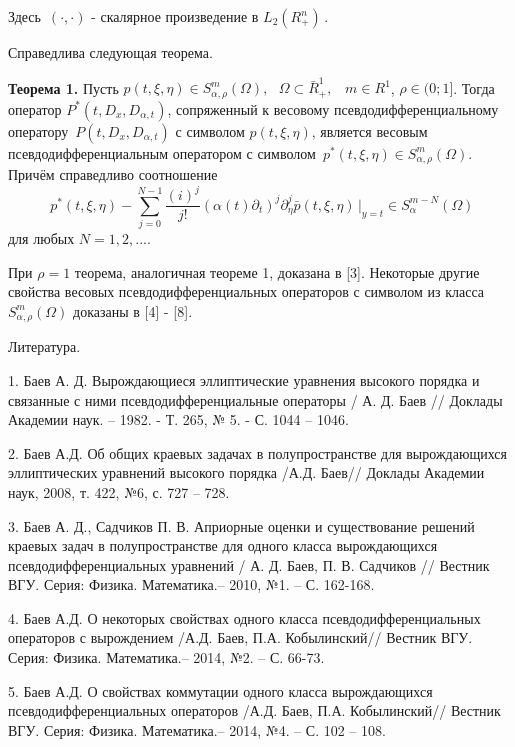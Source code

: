 {Здесь $\,( \cdot , \cdot )$ - скалярное произведение в $L_2 (R_ + ^n )\,$.

Справедлива следующая теорема.

\textbf{Теорема 1.} Пусть $p(t,\xi ,\eta ) \in S_{\alpha ,\rho }^m (\Omega
),\,\,\,\,\Omega \subset \bar {R}_ + ^1 ,\,\,\,\,\,m \in R^1$, $\rho \in
(0;1]$. Тогда оператор $P^\ast (t,D_x ,D_{\alpha ,t} )$, сопряженный к
весовому псевдодифференциальному оператору $\,P(t,D_x ,D_{\alpha ,t} )$ с
символом $p(t,\xi ,\eta )$, является весовым псевдодифференциальным
оператором с символом $\,p^\ast (t,\xi ,\eta ) \in S_{\alpha ,\rho }^m
(\Omega )$. Причём справедливо соотношение
\[
\,\,p^\ast (t,\xi ,\eta ) - \sum\limits_{j = 0}^{N - 1} {\frac{(i)^j}{j!}}
(\alpha (t)\partial _t )^j\partial _\eta ^j \left. {\bar {p}(t,\xi ,\eta
)\,} \right|_{y = t} \in S_\alpha ^{m - N} (\Omega )
\]
для любых $N = 1,2,...$.



При $\rho = 1$ теорема, аналогичная теореме 1, доказана в [3]. Некоторые
другие свойства весовых псевдодифференциальных операторов с символом из
класса $S_{\alpha ,\rho }^m (\Omega )$ доказаны в [4] - [8].

\begin{center}
Литература.
\end{center}

1. Баев А. Д. Вырождающиеся эллиптические уравнения высокого порядка и
связанные с ними псевдодифференциальные операторы / А. Д. Баев // Доклады
Академии наук. -- 1982. - Т. 265, № 5. - С. 1044 -- 1046.

2. Баев А.Д. Об общих краевых задачах в полупространстве для вырождающихся
эллиптических уравнений высокого порядка /А.Д. Баев// Доклады Академии наук,
2008, т. 422, №6, с. 727 -- 728.

3. Баев А. Д., Садчиков П. В. Априорные оценки и существование решений
краевых задач в полупространстве для одного класса вырождающихся
псевдодифференциальных уравнений / А. Д. Баев, П. В. Садчиков // Вестник
ВГУ. Серия: Физика. Математика.-- 2010, №1. -- С. 162-168.

4. Баев А.Д. О некоторых свойствах одного класса псевдодифференциальных
операторов с вырождением /А.Д. Баев, П.А. Кобылинский// Вестник ВГУ. Серия:
Физика. Математика.-- 2014, №2. -- С. 66-73.

5. Баев А.Д. О свойствах коммутации одного класса вырождающихся
псевдодифференциальных операторов /А.Д. Баев, П.А. Кобылинский// Вестник
ВГУ. Серия: Физика. Математика.-- 2014, №4. -- С. 102 -- 108.

}
